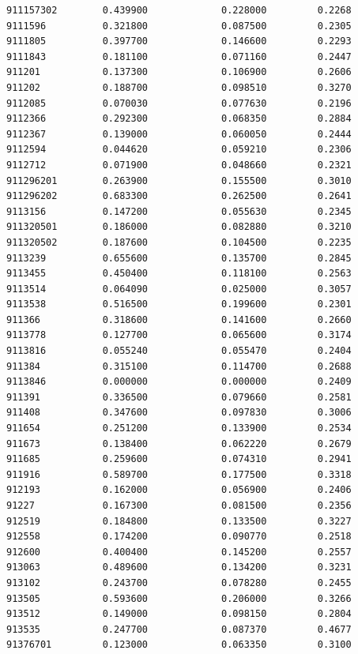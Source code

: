 \documentclass[
  letterpaper,
  DIV=11,
  numbers=noendperiod]{scrartcl}
\begin{document}
\begin{verbatim}
911157302        0.439900             0.228000         0.2268
9111596          0.321800             0.087500         0.2305
9111805          0.397700             0.146600         0.2293
9111843          0.181100             0.071160         0.2447
911201           0.137300             0.106900         0.2606
911202           0.188700             0.098510         0.3270
9112085          0.070030             0.077630         0.2196
9112366          0.292300             0.068350         0.2884
9112367          0.139000             0.060050         0.2444
9112594          0.044620             0.059210         0.2306
9112712          0.071900             0.048660         0.2321
911296201        0.263900             0.155500         0.3010
911296202        0.683300             0.262500         0.2641
9113156          0.147200             0.055630         0.2345
911320501        0.186000             0.082880         0.3210
911320502        0.187600             0.104500         0.2235
9113239          0.655600             0.135700         0.2845
9113455          0.450400             0.118100         0.2563
9113514          0.064090             0.025000         0.3057
9113538          0.516500             0.199600         0.2301
911366           0.318600             0.141600         0.2660
9113778          0.127700             0.065600         0.3174
9113816          0.055240             0.055470         0.2404
911384           0.315100             0.114700         0.2688
9113846          0.000000             0.000000         0.2409
911391           0.336500             0.079660         0.2581
911408           0.347600             0.097830         0.3006
911654           0.251200             0.133900         0.2534
911673           0.138400             0.062220         0.2679
911685           0.259600             0.074310         0.2941
911916           0.589700             0.177500         0.3318
912193           0.162000             0.056900         0.2406
91227            0.167300             0.081500         0.2356
912519           0.184800             0.133500         0.3227
912558           0.174200             0.090770         0.2518
912600           0.400400             0.145200         0.2557
913063           0.489600             0.134200         0.3231
913102           0.243700             0.078280         0.2455
913505           0.593600             0.206000         0.3266
913512           0.149000             0.098150         0.2804
913535           0.247700             0.087370         0.4677
91376701         0.123000             0.063350         0.3100

\end{verbatim}
\end{document}
